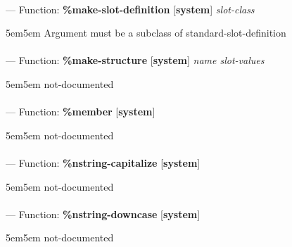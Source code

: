 \paragraph{}
\label{SYSTEM:MAKE-SLOT-DEFINITION}
--- Function: \textbf{\%make-slot-definition} [\textbf{system}] \textit{slot-class}

\begin{adjustwidth}{5em}{5em}
Argument must be a subclass of standard-slot-definition
\end{adjustwidth}

\paragraph{}
\label{SYSTEM:MAKE-STRUCTURE}
--- Function: \textbf{\%make-structure} [\textbf{system}] \textit{name slot-values}

\begin{adjustwidth}{5em}{5em}
not-documented
\end{adjustwidth}

\paragraph{}
\label{SYSTEM:MEMBER}
--- Function: \textbf{\%member} [\textbf{system}] \textit{}

\begin{adjustwidth}{5em}{5em}
not-documented
\end{adjustwidth}

\paragraph{}
\label{SYSTEM:NSTRING-CAPITALIZE}
--- Function: \textbf{\%nstring-capitalize} [\textbf{system}] \textit{}

\begin{adjustwidth}{5em}{5em}
not-documented
\end{adjustwidth}

\paragraph{}
\label{SYSTEM:NSTRING-DOWNCASE}
--- Function: \textbf{\%nstring-downcase} [\textbf{system}] \textit{}

\begin{adjustwidth}{5em}{5em}
not-documented
\end{adjustwidth}

